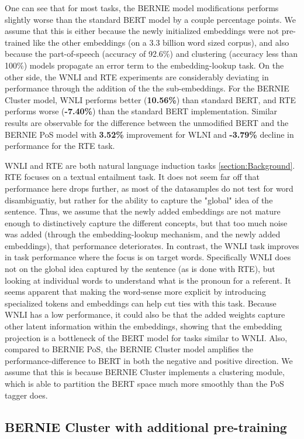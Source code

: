 \documentclass[a4paper,12pt,twoside,openright]{report}
\begin{document}
One can see that for most tasks, the BERNIE model modifications performs slightly worse than the standard BERT model by a couple percentage points.
We assume that this is either because the newly initialized embeddings were not pre-trained like the other embeddings (on a 3.3 billion word sized corpus), and also because the part-of-speech (accuracy of 92.6\%) and clustering (accuracy less than 100\%) models propagate an error term to the embedding-lookup task.
On the other side, the WNLI and RTE experiments are considerably deviating in performance through the addition of the the sub-embeddings.
For the BERNIE Cluster model, WNLI performs better (\textbf{10.56\%}) than standard BERT, and RTE performs worse  (\textbf{-7.40\%}) than the standard BERT implementation.
Similar results are observable for the difference between the unmodified BERT and the BERNIE PoS model with \textbf{3.52\%} improvement for WLNI and \textbf{-3.79\%} decline in performance for the RTE task.

WNLI and RTE are both natural language induction tasks \ref{section:Background}.
RTE focuses on a textual entailment task. 
It does not seem far off that performance here drops further, as most of the datasamples do not test for word disambiguatiy, but rather for the ability to capture the "global" idea of the sentence.
Thus, we assume that the newly added embeddings are not mature enough to distinctively capture the different concepts, but that too much noise was added (through the embedding-lookup mechanism, and the newly added embeddings), that performance deteriorates.
In contrast, the WNLI task improves in task performance where the focus is on target words. 
Specifically WNLI does not on the global idea captured by the sentence (as is done with RTE), but looking at individual words to understand what is the pronoun for a referent.
It seems apparent that making the word-sense more explicit by introducing specialized tokens and embeddings can help cut ties with this task.
Because WNLI has a low performance, it could also be that the added weights capture other latent information within the embeddings, showing that the embedding projection is a bottleneck of the BERT model for tasks similar to WNLI.
Also, compared to BERNIE PoS, the BERNIE Cluster model amplifies the performance-difference to BERT in both the negative and positive direction.
We assume that this is because BERNIE Cluster implements a clustering module, which is able to partition the BERT space much more smoothly than the PoS tagger does.

\subsection{BERNIE Cluster with additional pre-training}
\end{document}
